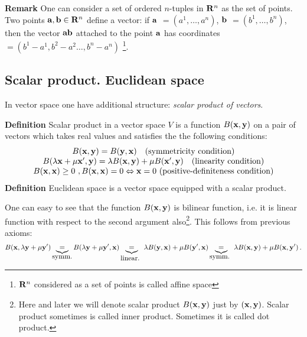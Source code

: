 \documentclass[12pt]{article}
\numberwithin{equation}{section}
\begin{document}
\m


{\bf Remark} One can consider a set of ordered $n$-tuples in ${\bf R}^n$ as the set of
points.
   Two points
   ${\bf a,b}\in {\bf R}^n$ define a vector:
   if $\bf a$ $=(a^1,\dots,a^n)$, $\bf b$ $=(b^1,\dots,b^n)$, then
   the vector $\bf ab$ attached to the point $\bf a$
   has coordinates $=(b^1-a^1,b^2-a^2\dots,b^n-a^n)$
   \footnote{${\bf R}^n$ considered as a set of points is called affine space}.



\subsection {Scalar product. Euclidean space}

In vector space one have additional structure: {\it scalar product of vectors}.

{\bf Definition} Scalar product in a vector space $V$ is  a function $B({\bf x},{\bf y})$ on a pair of
 vectors which takes real values and satisfies the  the following conditions:
               \begin{equation}\label{scalarproductproperties}
              \begin{array}  {cc}
                B({\bf x},{\bf y})=B({\bf y},{\bf x}) \quad \hbox  {(symmetricity condition)}\\
                   B(\lambda{\bf x}+\mu{\bf x}',{\bf y})=
                   \lambda B({\bf x},{\bf y})+\mu B({\bf x}',{\bf y})\quad   \hbox  {(linearity condition)}\\
                 B( {\bf x},{\bf x})\geq 0\,\, , B({\bf x},{\bf x})= 0\Leftrightarrow  {\bf x}=0\,\,
                 \hbox{(positive-definiteness condition)}
                   \end{array}
               \end{equation}
{\bf Definition } Euclidean space is a vector space equipped with a scalar product.

\m


  One can easy to see that the function $B({\bf x},{\bf y})$ is bilinear function, i.e.
  it is linear function with respect to the second argument also\footnote{Here and later we will denote scalar
   product $B({\bf x},{\bf y})$ just by $({\bf x},{\bf y})$. Scalar product sometimes is called inner product. Sometimes it is called
    dot product.}.
  This follows from previous axioms:
                   $$
   B({\bf x},\lambda{\bf y}+\mu{\bf y}')\underbrace{=}_{\hbox {symm.}}B(\lambda{\bf y}+\mu{\bf y}',{\bf x})
   \underbrace{=}_{\hbox {linear. }}\lambda B({\bf y},{\bf x})+\mu B({\bf y}',{\bf x})
   \underbrace{=}_{\hbox {symm. }}\lambda B({\bf x},{\bf y})+\mu B({\bf x},{\bf y}')\,.
                   $$
\end{document}
